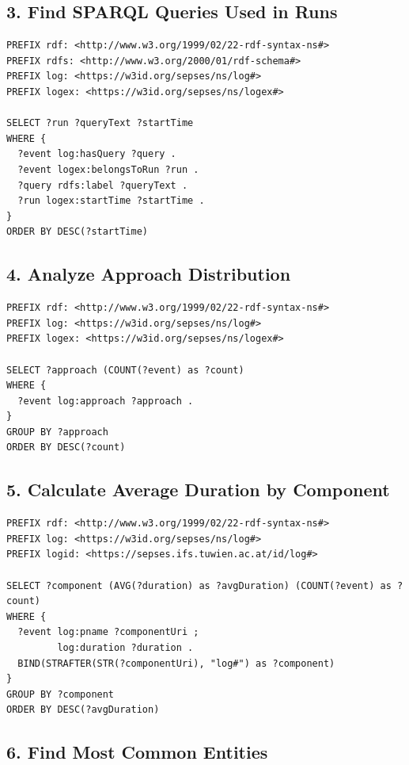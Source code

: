 \subsection*{3. Find SPARQL Queries Used in Runs}

\begin{lstlisting}[language=sparql]
PREFIX rdf: <http://www.w3.org/1999/02/22-rdf-syntax-ns#>
PREFIX rdfs: <http://www.w3.org/2000/01/rdf-schema#>
PREFIX log: <https://w3id.org/sepses/ns/log#>
PREFIX logex: <https://w3id.org/sepses/ns/logex#>

SELECT ?run ?queryText ?startTime
WHERE {
  ?event log:hasQuery ?query .
  ?event logex:belongsToRun ?run .
  ?query rdfs:label ?queryText .
  ?run logex:startTime ?startTime .
}
ORDER BY DESC(?startTime)
\end{lstlisting}

\subsection*{4. Analyze Approach Distribution}

\begin{lstlisting}[language=sparql]
PREFIX rdf: <http://www.w3.org/1999/02/22-rdf-syntax-ns#>
PREFIX log: <https://w3id.org/sepses/ns/log#>
PREFIX logex: <https://w3id.org/sepses/ns/logex#>

SELECT ?approach (COUNT(?event) as ?count)
WHERE {
  ?event log:approach ?approach .
}
GROUP BY ?approach
ORDER BY DESC(?count)
\end{lstlisting}

\subsection*{5. Calculate Average Duration by Component}

\begin{lstlisting}[language=sparql]
PREFIX rdf: <http://www.w3.org/1999/02/22-rdf-syntax-ns#>
PREFIX log: <https://w3id.org/sepses/ns/log#>
PREFIX logid: <https://sepses.ifs.tuwien.ac.at/id/log#>

SELECT ?component (AVG(?duration) as ?avgDuration) (COUNT(?event) as ?count)
WHERE {
  ?event log:pname ?componentUri ;
         log:duration ?duration .
  BIND(STRAFTER(STR(?componentUri), "log#") as ?component)
}
GROUP BY ?component
ORDER BY DESC(?avgDuration)
\end{lstlisting}

\subsection*{6. Find Most Common Entities}

